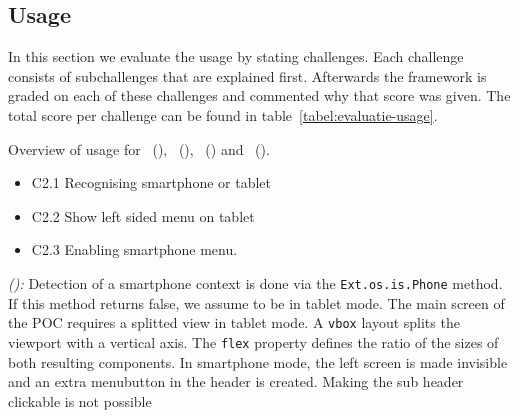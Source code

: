 \documentclass[a4paper]{artikel3}
\newcommand{\code}[1]{\texttt{#1}}
\newcommand{\setspace}[0]{\vspace{2mm}}
\renewcommand{\paragraph}[1]{\setspace \noindent {\bf #1}  }
\newcommand{\framework}[2]{ \emph{#1 (\textbf{#2}): }} %
\newcommand{\challenge}[1]{\paragraph{#1}}
\begin{document}

\subsection{Usage}
\label{sec:evaluation-usage}
In this section we evaluate the usage by stating challenges.
Each challenge consists of subchallenges that are explained first.
Afterwards the framework is graded on each of these challenges and commented why that score was given.
The total score per challenge can be found in table~\ref{tabel:evaluatie-usage}.

\begin{table}
\centering
\resizebox{8.5cm}{!} {
}
\caption{Overview of usage for \st{}~(\sta), \kendo{}~(\kendoa), \jqm{}~(\jqma) and \lungo{}~(\lungoa).}
\label{tabel:evaluatie-usage}
\end{table}


\challenge{\chal{toestel}}
\begin{itemize}
  \item C2.1 Recognising smartphone or tablet
  \item C2.2 Show left sided menu on tablet 
  \item C2.3 Enabling smartphone menu.
\end{itemize}

\framework{\sta{}}{}
Detection of a smartphone context is done via the \code{Ext.os.is.Phone} method.  
If this method returns false,  we assume to be in tablet mode.    
The main screen of the POC requires a splitted view in tablet mode.  
A \code{vbox} layout splits the viewport with a vertical axis.  
The \code{flex} property defines the ratio of the sizes of both resulting components. 
In smartphone mode,  the left screen is made invisible and an extra menubutton in the header is created.  
Making the sub header clickable is not possible  
\end{document}
